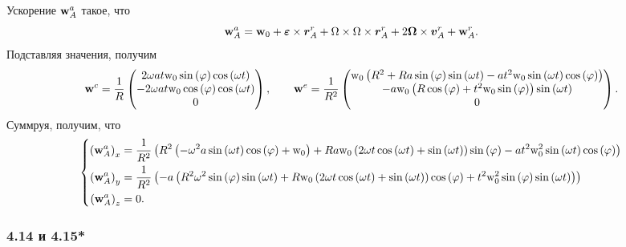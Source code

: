 Ускорение $\mbox{\boldmath $\mathrm{w}$}_A^a$ такое, что
$$
    \mbox{\boldmath $\mathrm{w}$}_A^a = 
    \mbox{\boldmath $\mathrm{w}$}_0 + \mbox{\boldmath $\varepsilon$} \times \mbox{\boldmath $r$}_A^r +
    \Omega \times \Omega \times \mbox{\boldmath $r$}_A^r +
    2 \mbox{\boldmath $\Omega$} \times \mbox{\boldmath $v$}_A^r + \mbox{\boldmath $\mathrm{w}$}^r_A.
$$
Подставляя значения, получим
$$
    \mbox{\boldmath $\mathrm{w}$}^c = \frac{1}{R} 
    \left(\begin{matrix}2 \omega a t \mathrm{w}_0 \sin{\left(\varphi \right)} \cos{\left(\omega t \right)}\\- 2 \omega a t \mathrm{w}_0 \cos{\left(\varphi \right)} \cos{\left(\omega t \right)}\\0\end{matrix}\right), \hspace{0.7cm} 
    \mbox{\boldmath $\mathrm{w}$}^e = \frac{1}{R^2} 
     \left(\begin{matrix}\mathrm{w}_0 \left(R^{2} + R a \sin{\left(\varphi \right)} \sin{\left(\omega t \right)} - a t^{2} \mathrm{w}_0 \sin{\left(\omega t \right)} \cos{\left(\varphi \right)}\right)\\- a \mathrm{w}_0 \left(R \cos{\left(\varphi \right)} + t^{2} \mathrm{w}_0 \sin{\left(\varphi \right)}\right) \sin{\left(\omega t \right)}\\0\end{matrix}\right).
$$
Суммруя, получим, что
$$
    \left\{\begin{aligned}
        \left(\mbox{\boldmath $\mathrm{w}$}_A^a\right)_x &= 
        \frac{1}{R^2} \left(
            R^{2} \left(- \omega^{2} a \sin{\left(\omega t \right)} \cos{\left(\varphi \right)} + \mathrm{w}_0\right) + R a \mathrm{w}_0 \left(2 \omega t \cos{\left(\omega t \right)} + \sin{\left(\omega t \right)}\right) \sin{\left(\varphi \right)} - a t^{2} \mathrm{w}_0^{2} \sin{\left(\omega t \right)} \cos{\left(\varphi \right)}
        \right) \\
    \left(\mbox{\boldmath $\mathrm{w}$}_A^a\right)_y &= 
    \frac{1}{R^2} \left(
        - a \left(R^{2} \omega^{2} \sin{\left(\varphi \right)} \sin{\left(\omega t \right)} + R \mathrm{w}_0 \left(2 \omega t \cos{\left(\omega t \right)} + \sin{\left(\omega t \right)}\right) \cos{\left(\varphi \right)} + t^{2} \mathrm{w}_0^{2} \sin{\left(\varphi \right)} \sin{\left(\omega t \right)}\right)
    \right) \\
    \left(\mbox{\boldmath $\mathrm{w}$}_A^a\right)_z &= 0.
    \end{aligned}\right.
$$



\subsubsection*{4.14 и 4.15*}

